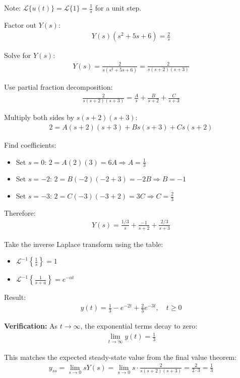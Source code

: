 \documentclass[11pt,a4paper]{article}
\begin{document}
Note: $\mathcal{L}\{u(t)\} = \mathcal{L}\{1\} = \frac{1}{s}$ for a unit step.

Factor out $Y(s)$:
\begin{align}
Y(s)(s^2 + 5s + 6) = \frac{2}{s}
\end{align}

Solve for $Y(s)$:
\begin{align}
Y(s) = \frac{2}{s(s^2+5s+6)} = \frac{2}{s(s+2)(s+3)}
\end{align}

Use partial fraction decomposition:
\begin{align}
\frac{2}{s(s+2)(s+3)} = \frac{A}{s} + \frac{B}{s+2} + \frac{C}{s+3}
\end{align}

Multiply both sides by $s(s+2)(s+3)$:
\begin{align}
2 = A(s+2)(s+3) + Bs(s+3) + Cs(s+2)
\end{align}

Find coefficients:
\begin{itemize}
\item Set $s = 0$: $2 = A(2)(3) = 6A \Rightarrow A = \frac{1}{3}$
\item Set $s = -2$: $2 = B(-2)(-2+3) = -2B \Rightarrow B = -1$
\item Set $s = -3$: $2 = C(-3)(-3+2) = 3C \Rightarrow C = \frac{2}{3}$
\end{itemize}

Therefore:
\begin{align}
Y(s) = \frac{1/3}{s} + \frac{-1}{s+2} + \frac{2/3}{s+3}
\end{align}

Take the inverse Laplace transform using the table:
\begin{itemize}
\item $\mathcal{L}^{-1}\left\{\frac{1}{s}\right\} = 1$
\item $\mathcal{L}^{-1}\left\{\frac{1}{s+a}\right\} = e^{-at}$
\end{itemize}

Result:
\begin{align}
y(t) = \frac{1}{3} - e^{-2t} + \frac{2}{3}e^{-3t}, \quad t \geq 0
\end{align}

\textbf{Verification:} As $t \to \infty$, the exponential terms decay to zero:
\begin{align}
\lim_{t \to \infty} y(t) = \frac{1}{3}
\end{align}

This matches the expected steady-state value from the final value theorem:
\begin{align}
y_{ss} = \lim_{s \to 0} sY(s) = \lim_{s \to 0} s \cdot \frac{2}{s(s+2)(s+3)} = \frac{2}{2 \cdot 3} = \frac{1}{3}
\end{align}
\end{document}

